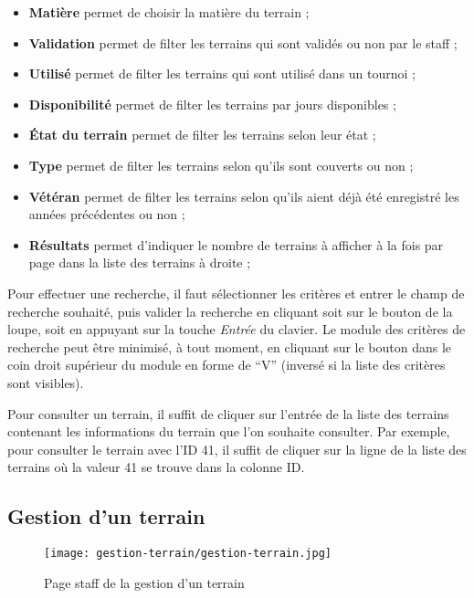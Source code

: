 \begin{itemize}
\item \textbf{Matière} permet de choisir la matière du terrain ;
\item \textbf{Validation} permet de filter les terrains qui sont validés ou non par le staff ;
\item \textbf{Utilisé} permet de filter les terrains qui sont utilisé dans un tournoi ;
\item \textbf{Disponibilité} permet de filter les terrains par jours disponibles ;
\item \textbf{État du terrain} permet de filter les terrains selon leur état ;
\item \textbf{Type } permet de filter les terrains selon qu'ils sont couverts ou non ;
\item \textbf{Vétéran} permet de filter les terrains selon qu'ils aient déjà été enregistré les années précédentes ou non ;
\item \textbf{Résultats} permet d'indiquer le nombre de terrains à afficher à la fois par page dans la liste des terrains à droite ;
\end{itemize}
\bigskip

Pour effectuer une recherche, il faut sélectionner les critères et entrer le champ de recherche souhaité, puis valider la recherche en cliquant soit sur le bouton de la loupe, soit en appuyant sur la touche \textit{Entrée} du clavier. Le module des critères de recherche peut être minimisé, à tout moment, en cliquant sur le bouton dans le coin droit supérieur du module en forme de \enquote{V} (inversé si la liste des critères sont visibles).\newline

Pour consulter un terrain, il suffit de cliquer sur l'entrée de la liste des terrains contenant les informations du terrain que l'on souhaite consulter. Par exemple, pour consulter le terrain avec l'ID 41, il suffit de cliquer sur la ligne de la liste des terrains où la valeur 41 se trouve dans la colonne ID.

\subsection{Gestion d'un terrain}

\begin{figure}[H]
\centering
\texttt{[image: gestion-terrain/gestion-terrain.jpg]}
\caption{Page staff de la gestion d'un terrain}
\end{figure}

